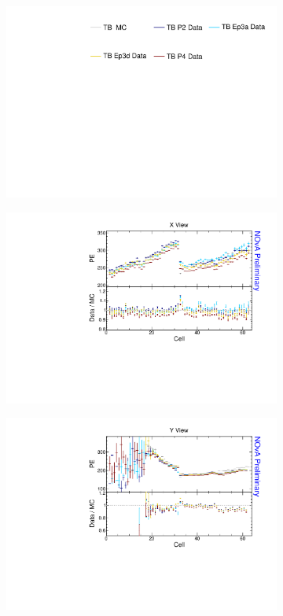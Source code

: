 \begin{figure}[!ht]
  \begin{subfigure}{\textwidth}
  \centering
    \includegraphics[height=0.2\linewidth]{essentialsec_tb/legend.pdf}
  \end{subfigure}
  \vspace*{2mm}

  \begin{subfigure}{0.5\textwidth}
    \includegraphics[width=\linewidth]{essentialsec_tb/pe_cell_x.pdf}
  \end{subfigure}
  \begin{subfigure}{0.5\textwidth}
    \includegraphics[width=\linewidth]{essentialsec_tb/pe_cell_y.pdf}

\end{subfigure}
\end{figure}
